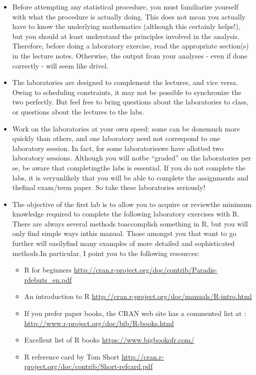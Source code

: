 \documentclass[
  12pt,
]{book}
\providecommand{\tightlist}{%
  \setlength{\itemsep}{0pt}\setlength{\parskip}{0pt}}
\begin{document}
\begin{itemize}
\item
  Before attempting any statistical procedure, you must familiarize yourself with what the procedure is actually doing. This does not mean you actually have to know the underlying mathematics (although this certainly helps!), but you should at least understand the principles involved in the analysis. Therefore, before doing a laboratory exercise, read the appropriate section(s) in the lecture notes. Otherwise, the output from your analyses - even if done correctly - will seem like drivel.
\item
  The laboratories are designed to complement the lectures, and vice versa. Owing to scheduling constraints, it may not be possible to synchronize the two perfectly. But feel free to bring questions about the laboratories to class, or questions about the lectures to the labs.
\item
  Work on the laboratories at your own speed: some can be donemuch more quickly than others, and one laboratory need not correspond to one laboratory session. In fact, for some laboratorieswe have allotted two laboratory sessions. Although you will notbe ``graded'' on the laboratories per se, be aware that completingthe labs is essential. If you do not complete the labs, it is veryunlikely that you will be able to complete the assignments and thefinal exam/term paper. So take these laboratories seriously!
\item
  The objective of the first lab is to allow you to acquire or reviewthe minimum knowledge required to complete the following laboratory exercises with R. There are always several methods toaccomplish something in R, but you will only find simple ways inthis manual. Those amongst you that want to go further will easilyfind many examples of more detailed and sophisticated methods.In particular, I point you to the following resources:

  \begin{itemize}
  \tightlist
  \item
    R for beginners
    \url{http://cran.r-project.org/doc/contrib/Paradis-rdebuts_en.pdf}
  \item
    An introduction to R
    \url{http://cran.r-project.org/doc/manuals/R-intro.html}
  \item
    If you prefer paper books, the CRAN web site has a commented list at :
    \url{http://www.r-project.org/doc/bib/R-books.html}
  \item
    Excellent list of R books
    \url{https://www.bigbookofr.com/}
  \item
    R reference card by Tom Short
    \url{http://cran.r-project.org/doc/contrib/Short-refcard.pdf}
  \end{itemize}
\end{itemize}
\end{document}
